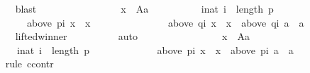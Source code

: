 \begin{isabellebody}
\ \ \ \ \ \ \ \ \isamarkupfalse%
\ blast\isanewline
\ \ \ \ \ \ \isamarkupfalse%
\ \isamarkupfalse%
\isanewline
\ \ \ \ \ \ \ \ {\isachardoublequoteopen}{\isasymforall}x\ {\isasymin}\ A{\isacharminus}{\kern0pt}{\isacharbraceleft}{\kern0pt}a{\isacharbraceright}{\kern0pt}{\isachardot}{\kern0pt}\isanewline
\ \ \ \ \ \ \ \ \ \ {\isasymforall}i{\isacharcolon}{\kern0pt}{\isacharcolon}{\kern0pt}nat{\isachardot}{\kern0pt}\ i\ {\isacharless}{\kern0pt}\ length\ p\ {\isasymlongrightarrow}\isanewline
\ \ \ \ \ \ \ \ \ \ \ \ {\isacharparenleft}{\kern0pt}above\ {\isacharparenleft}{\kern0pt}p{\isacharbang}{\kern0pt}i{\isacharparenright}{\kern0pt}\ x\ {\isacharequal}{\kern0pt}\ {\isacharbraceleft}{\kern0pt}x{\isacharbraceright}{\kern0pt}\ {\isasymlongrightarrow}\isanewline
\ \ \ \ \ \ \ \ \ \ \ \ \ \ {\isacharparenleft}{\kern0pt}above\ {\isacharparenleft}{\kern0pt}q{\isacharbang}{\kern0pt}i{\isacharparenright}{\kern0pt}\ x\ {\isacharequal}{\kern0pt}\ {\isacharbraceleft}{\kern0pt}x{\isacharbraceright}{\kern0pt}\ {\isasymor}\ above\ {\isacharparenleft}{\kern0pt}q{\isacharbang}{\kern0pt}i{\isacharparenright}{\kern0pt}\ a\ {\isacharequal}{\kern0pt}\ {\isacharbraceleft}{\kern0pt}a{\isacharbraceright}{\kern0pt}{\isacharparenright}{\kern0pt}{\isacharparenright}{\kern0pt}{\isachardoublequoteclose}\isanewline
\ \ \ \ \ \ \ \ \isamarkupfalse%
\ lifted{\isacharunderscore}{\kern0pt}winner\isanewline
\ \ \ \ \ \ \ \ \isamarkupfalse%
\ auto\isanewline
\ \ \ \ \ \ \isamarkupfalse%
\ \isamarkupfalse%
\isanewline
\ \ \ \ \ \ \ \ {\isachardoublequoteopen}{\isasymforall}x\ {\isasymin}\ A{\isacharminus}{\kern0pt}{\isacharbraceleft}{\kern0pt}a{\isacharbraceright}{\kern0pt}{\isachardot}{\kern0pt}\isanewline
\ \ \ \ \ \ \ \ \ \ {\isasymforall}i{\isacharcolon}{\kern0pt}{\isacharcolon}{\kern0pt}nat{\isachardot}{\kern0pt}\ i\ {\isacharless}{\kern0pt}\ length\ p\ {\isasymlongrightarrow}\isanewline
\ \ \ \ \ \ \ \ \ \ \ \ {\isacharparenleft}{\kern0pt}above\ {\isacharparenleft}{\kern0pt}p{\isacharbang}{\kern0pt}i{\isacharparenright}{\kern0pt}\ x\ {\isacharequal}{\kern0pt}\ {\isacharbraceleft}{\kern0pt}x{\isacharbraceright}{\kern0pt}\ {\isasymlongrightarrow}\ above\ {\isacharparenleft}{\kern0pt}p{\isacharbang}{\kern0pt}i{\isacharparenright}{\kern0pt}\ a\ {\isasymnoteq}\ {\isacharbraceleft}{\kern0pt}a{\isacharbraceright}{\kern0pt}{\isacharparenright}{\kern0pt}{\isachardoublequoteclose}\isanewline
\ \ \ \ \ \ \isamarkupfalse%
\ {\isacharparenleft}{\kern0pt}rule\ ccontr{\isacharparenright}{\kern0pt}\isanewline

\end{isabellebody}
